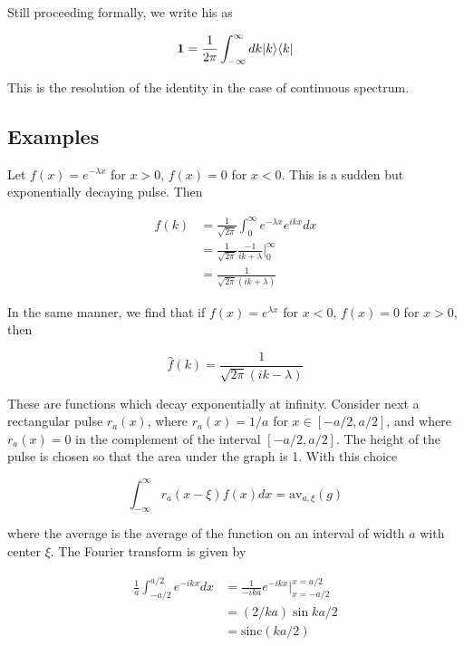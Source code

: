 Still proceeding formally, we write his as

\begin{equation}
{\bf 1} = \frac{1}{2\pi} \int_{-\infty}^\infty dk | k \rangle \langle k |
\end{equation}

This is the resolution of the identity in the case of continuous spectrum.




\subsection{Examples}

Let $f(x) = e^{-\lambda x}$ for $x > 0$, $f(x) = 0$ for $x < 0$.  This is a sudden but exponentially decaying pulse. Then

\begin{align}
\hat f(k) &= \frac{1}{\sqrt{2\pi}}\int_0^\infty e^{-\lambda x} e^{ikx} dx \\
&= \frac{1}{\sqrt{2\pi}} \frac{-1}{ik + \lambda}\Big\vert_0^\infty \\
 &= \frac{1}{\sqrt{2\pi}(ik + \lambda)}
\end{align}

In the same manner, we find that if $f(x) = e^{\lambda x}$ for $x < 0$, $f(x) = 0$ for $x > 0$, then

\begin{equation}
\hat f(k) =  \frac{1}{\sqrt{2\pi}(ik - \lambda)}
\end{equation}


These are functions which decay exponentially at infinity.  Consider next a rectangular pulse $r_a(x)$, where $r_a(x) = 1/a$ for $x \in [-a/2,a/2]$,  and where $r_a(x) = 0$ in the complement of the interval $[-a/2,a/2]$.  The height of the pulse is chosen so that the area under the graph is 1.  With this choice

\begin{equation}
  \int_{-\infty}^\infty r_a(x-\xi)f(x) dx = \text{av}_{a, \xi}(g)
\end{equation}

where the average is the average of the function on an interval of width $a$ with center $\xi$.  The Fourier transform is given by

\begin{align}
\frac{1}{a}\int_{-a/2}^{a/2} e^{-ikx} dx
  &= \frac{1}{-ika} e^{-ikx} \Big\vert_{x=-a/2}^{x=a/2} \\
  &= (2/ka)\sin ka/2 \\
  &= \text{sinc}(ka/2)
\end{align}

